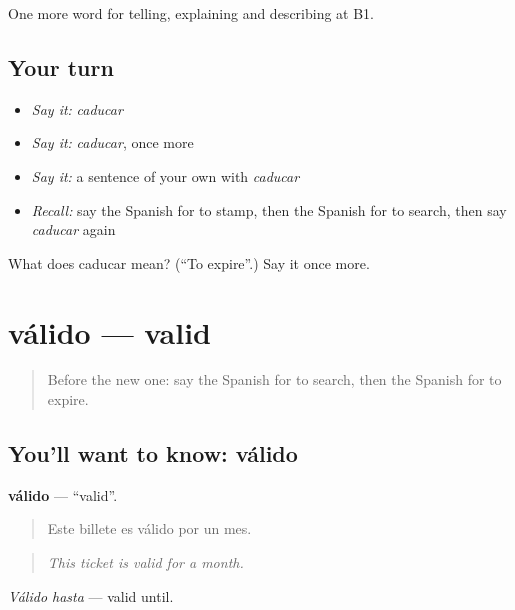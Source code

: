 \begin{grammarlens}[title={What you've built}]
One more word for telling, explaining and describing at B1.
\end{grammarlens}

\subsection*{Your turn}
\begin{itemize}
\raggedright
  \item \emph{Say it:} \emph{caducar}
  \item \emph{Say it:} \emph{caducar}, once more
  \item \emph{Say it:} a sentence of your own with \emph{caducar}
  \item \emph{Recall:} say the Spanish for to stamp, then the Spanish for to search, then say \emph{caducar} again
\end{itemize}

\begin{tcolorbox}[breakable,colback=teal!4,colframe=teal!35!black,title={Before you move on}]
What does caducar mean? (\textquotedblleft{}To expire\textquotedblright{}.) Say it once more.
\end{tcolorbox}
\section[válido]{válido — valid}

\label{lesson:ES-C657-valido}



\begin{quote}
Before the new one: say the Spanish for to search, then the Spanish for to expire.
\end{quote}

\subsection*{You'll want to know: válido}
\textbf{válido} — \textquotedblleft{}valid\textquotedblright{}.

\begin{quote}
Este billete es válido por un mes.
\end{quote}

\begin{quote}
\emph{This ticket is valid for a month.}
\end{quote}

\emph{Válido hasta} — valid until.

